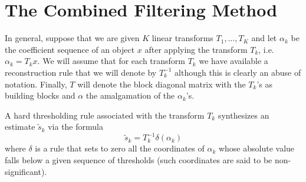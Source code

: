 
\chapter{The Combined Filtering Method}
 
In general, suppose that we are given $K$ linear transforms $T_1,
\ldots, T_K$ and let $\alpha_k$ be the coefficient sequence of an
object $x$ after applying the transform $T_k$, i.e. $\alpha_k = T_k
x$. We will assume that for each transform $T_k$ we have available a
reconstruction rule that we will denote by $T^{-1}_k$ although this is
clearly an abuse of notation.  Finally, $T$ will denote the block
diagonal matrix with the $T_k$'s as building blocks and $\alpha$ the
amalgamation of the $\alpha_k$'s.

A hard thresholding rule associated with the transform $T_k$ synthesizes 
an estimate $\tilde{s}_k$ via the formula 
\begin{equation}
\label{eq:ht}
\tilde{s}_k = T_k^{-1} \delta(\alpha_k)
\end{equation}
where $\delta$ is a rule that sets to zero all the coordinates of
$\alpha_k$ whose absolute value falls below a given sequence of
thresholds (such coordinates are said to be non-significant).
 
